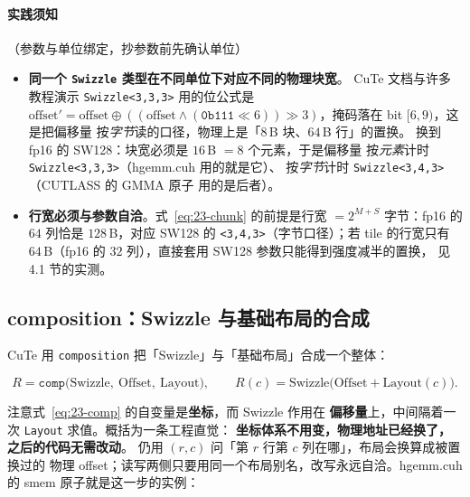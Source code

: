 \paragraph{实践须知}（参数与单位绑定，抄参数前先确认单位）
\begin{itemize}
  \item \textbf{同一个 \texttt{Swizzle} 类型在不同单位下对应不同的物理块宽}。
        CuTe 文档与许多教程演示 \texttt{Swizzle\allowbreak{}<3,\allowbreak{}3,\allowbreak{}3>} 用的位公式是
        $\text{offset}'=\text{offset}\oplus((\text{offset}\wedge
        (\texttt{0b111}\ll6))\gg3)$，掩码落在 bit $[6,9)$，这是把偏移量
        按\emph{字节}读的口径，物理上是「$8$\,B 块、$64$\,B 行」的置换。
        换到 fp16 的 SW128：块宽必须是 $16$\,B $=8$ 个元素，于是偏移量
        按\emph{元素}计时 \texttt{Swizzle\allowbreak{}<3,\allowbreak{}3,\allowbreak{}3>}（hgemm.cuh 用的就是它）、
        按\emph{字节}计时 \texttt{Swizzle\allowbreak{}<3,\allowbreak{}4,\allowbreak{}3>}（CUTLASS 的 GMMA 原子
        用的是后者）。
  \item \textbf{行宽必须与参数自洽}。式~\eqref{eq:23-chunk} 的前提是行宽
        $=2^{M+S}$ 字节：fp16 的 $64$ 列恰是 $128$\,B，对应 SW128 的
        \texttt{<3,4,3>}（字节口径）；若 tile 的行宽只有 $64$\,B（fp16 的
        $32$ 列），直接套用 SW128 参数只能得到强度减半的置换，
        见 4.1 节的实测。
\end{itemize}

\subsection{composition：Swizzle 与基础布局的合成}

CuTe 用 \texttt{composition} 把「Swizzle」与「基础布局」合成一个整体：

\begin{equation}
\label{eq:23-comp}
R = \texttt{comp}\big(\text{Swizzle},\ \text{Offset},\ \text{Layout}\big),
\qquad R(c) = \text{Swizzle}\Big(\text{Offset} + \text{Layout}(c)\Big).
\end{equation}

注意式~\eqref{eq:23-comp} 的自变量是\textbf{坐标}，而 Swizzle 作用在
\textbf{偏移量}上，中间隔着一次 \texttt{Layout} 求值。概括为一条工程直觉：
\textbf{坐标体系不用变，物理地址已经换了，之后的代码无需改动}。
仍用 $(r,c)$ 问「第 $r$ 行第 $c$ 列在哪」，布局会换算成被置换过的
物理 offset；读写两侧只要用同一个布局别名，改写永远自洽。hgemm.cuh 的
smem 原子就是这一步的实例：



